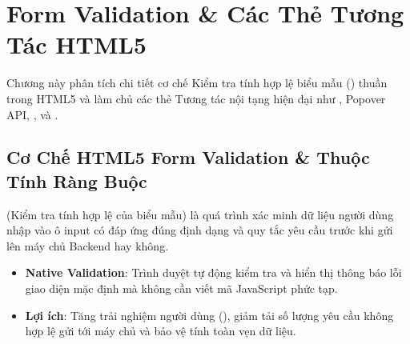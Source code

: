 \chapter{Form Validation \& Các Thẻ Tương Tác HTML5}
\label{chap:forms_validation_interactive}

Chương này phân tích chi tiết cơ chế Kiểm tra tính hợp lệ biểu mẫu () thuần trong HTML5 và làm chủ các thẻ Tương tác nội tạng hiện đại như , Popover API, ,  và .

\section{Cơ Chế HTML5 Form Validation \& Thuộc Tính Ràng Buộc}
\label{sec:form_validation_attributes}

\begin{conceptBox}
 (Kiểm tra tính hợp lệ của biểu mẫu) là quá trình xác minh dữ liệu người dùng nhập vào ô input có đáp ứng đúng định dạng và quy tắc yêu cầu trước khi gửi lên máy chủ Backend hay không.
\begin{itemize}[leftmargin=1.5em, itemsep=2pt, parsep=0pt]
    \item \textbf{Native Validation}: Trình duyệt tự động kiểm tra và hiển thị thông báo lỗi giao diện mặc định mà không cần viết mã JavaScript phức tạp.
    \item \textbf{Lợi ích}: Tăng trải nghiệm người dùng (), giảm tải số lượng yêu cầu không hợp lệ gửi tới máy chủ và bảo vệ tính toàn vẹn dữ liệu.
\end{itemize}
\end{conceptBox}

